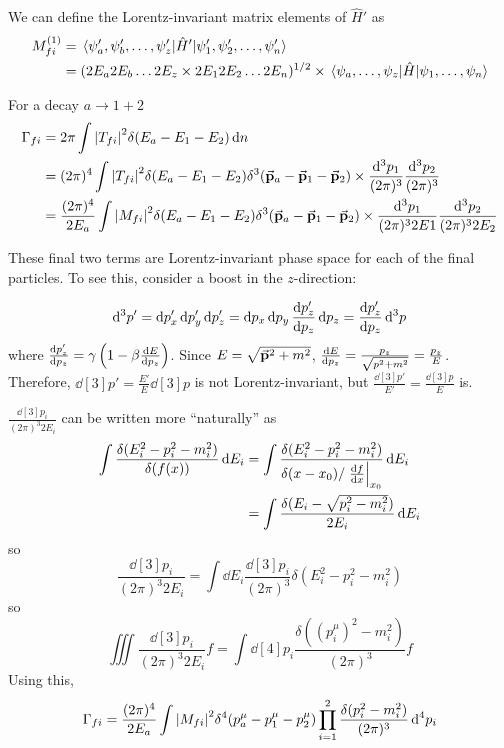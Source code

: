 \documentclass[a4paper,twoside,master.tex]{subfiles}
\begin{document}

We can define the Lorentz-invariant matrix elements of $ \hat{H}' $ as
\begin{align}
    M_{f i}^{(1)} &= \mel{\psi'_a, \psi'_b, \ldots, \psi'_z}{\hat{H}'}{\psi'_1, \psi'_2, \ldots, \psi'_n} \\
    &= (2E_a 2 E_b \ldots 2 E_z \times 2 E_1 2 E_2 \ldots 2 E_n )^{1/2} \times \mel{\psi_a, \ldots, \psi_z}{\hat{H}}{\psi_1, \ldots, \psi_n}
\end{align}

For a decay $ a \to 1 + 2 $
\begin{align}
    \Gamma_{f i} &= 2 \pi \int \abs{T_{f i}}^2 \delta(E_a - E_1 - E_2) \dd{n} \\
    &= (2 \pi)^4 \int \abs{T_{f i}}^2 \delta(E_a - E_1 - E_2) \delta^3(\va{p}_a - \va{p}_1 - \va{p}_2) \times \frac{\dd[3]{p_1}}{(2 \pi)^3} \frac{\dd[3]{p_2}}{(2 \pi)^3} \\
    &= \frac{(2 \pi)^4}{2 E_a} \int \abs{M_{f i}}^2 \delta(E_a - E_1 - E_2) \delta^3(\va{p}_a - \va{p}_1 - \va{p}_2) \times \frac{\dd[3]{p_1}}{(2 \pi)^3 2 E1} \frac{\dd[3]{p_2}}{(2 \pi)^3 2 E_2}
\end{align}

These final two terms are Lorentz-invariant phase space for each of the final particles. To see this, consider a boost in the $ z $-direction:

\begin{equation}
    \dd[3]{p'} = \dd{p'_x} \dd{p'_y} \dd{p'_z} = \dd{p_x} \dd{p_y} \dv{p'_z}{p_z} \dd{p_z} = \dv{p'_z}{p_z} \dd[3]{p}
\end{equation}
where $ \dv{p'_z}{p_z} = \gamma \left( 1- \beta \dv{E}{p_z} \right) $. Since $ E = \sqrt{\va{p}^2 + m^2} $, $ \dv{E}{p_z} = \frac{p_z}{\sqrt{p^2 + m^2}} = \frac{p_z}{E} $. Therefore, $ \dd[3]{p'} = \frac{E'}{E} \dd[3]{p} $ is not Lorentz-invariant, but $ \frac{\dd[3]{p'}}{E'} = \frac{\dd[3]{p}}{E} $ is.

$ \frac{\dd[3]{p_i}}{(2 \pi)^3 2 E_i} $ can be written more ``naturally'' as
\begin{align}
    \int \frac{\delta(E_i^2 - p_i^2 - m_i^2)}{\delta(f(x))} \dd{E_i} &= \int \frac{\delta(E_i^2 - p_i^2 - m_i^2)}{\delta(x - x_0)/ \eval{\dv{f}{x}}_{x_0}} \dd{E_i} \\
    &= \int \frac{\delta(E_i - \sqrt{p_i^2 - m_i^2})}{2 E_i} \dd{E_i}
\end{align}
so
\begin{equation}
    \frac{\dd[3]{p_i}}{(2 \pi)^3 2 E_i} = \int \dd{E_i} \frac{\dd[3]{p_i}}{(2 \pi)^3} \delta(E_i^2 - p_i^2 - m_i^2)
\end{equation}
so
\begin{equation}
    \iiint \frac{\dd[3]{p_i}}{(2 \pi)^3 2 E_i} f = \int \dd[4]{p_i} \frac{\delta( (p_i^{\mu})^2 - m_i^2)}{(2 \pi)^3} f
\end{equation}
Using this,
\begin{equation}
    \Gamma_{f i} = \frac{(2 \pi)^4}{2 E_a} \int \abs{M_{f i}}^2 \delta^4(p_a^{\mu} - p_1^{\mu} - p_2^{\mu}) \prod_{i=1}^{2} \frac{\delta(p_i^2 - m_i^2)}{(2 \pi)^3} \dd[4]{p_i}
\end{equation}
\end{document}
